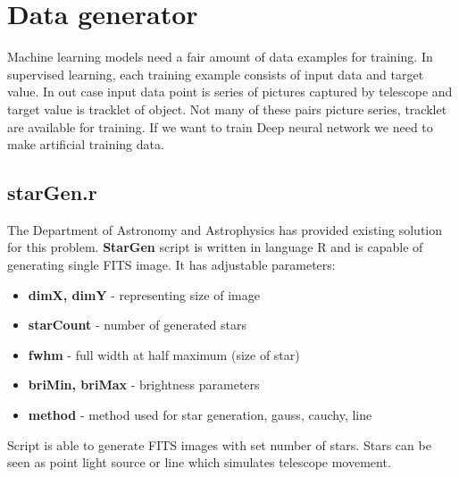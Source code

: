\section{Data generator}

Machine learning models need a fair amount of data examples for training. In supervised learning, each training example consists of input data and target value. In out case input data point is series of pictures captured by telescope and target value is tracklet of object. Not many of these pairs picture series, tracklet are available for training. If we want to train Deep neural network we need to make artificial training data.

\subsection{starGen.r}

The Department of Astronomy and Astrophysics has provided existing solution for this problem. \textbf{StarGen} script is written in language R and is capable of generating single FITS image. It has adjustable parameters:
\begin{itemize}
    \item \textbf{dimX, dimY} - representing size of image
    \item \textbf{starCount} - number of generated stars
    \item \textbf{fwhm} - full width at half maximum (size of star)
    \item \textbf{briMin, briMax} - brightness parameters
    \item \textbf{method} - method used for star generation, gauss, cauchy, line
\end{itemize}

Script is able to generate FITS images with set number of stars. Stars can be seen as point light source or line which simulates telescope movement. 


